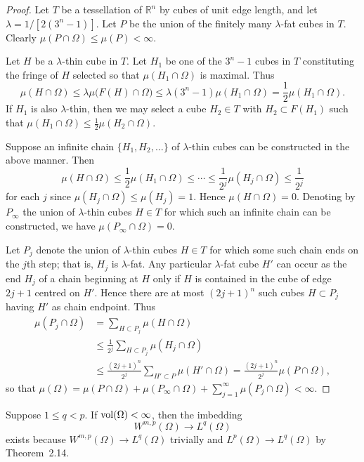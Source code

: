 \begin{proof}
  Let $T$ be a tessellation of $\mathbb{R}^n$ by cubes of unit edge length,
  and let $\lambda=1/[2(3^n-1)]$. Let $P$ be the union of the finitely many
  $\lambda$-fat cubes in $T$. Clearly $\mu(P\cap\Omega)\leq\mu(P)<\infty$.

  Let $H$ be a $\lambda$-thin cube in $T$. Let $H_1$ be one of the $3^n-1$
  cubes in $T$ constituting the fringe of $H$ selected so that $\mu(H_1\cap\Omega)$
  is maximal. Thus
  \[ \mu(H\cap\Omega) \leq \lambda \mu\bigl(F(H)\cap\Omega\bigr) 
      \leq \lambda (3^n-1) \mu(H_1\cap\Omega) = \frac12 \mu(H_1\cap\Omega). \]
  If $H_1$ is also $\lambda$-thin, then we may select a cube $H_2\in T$ with
  $H_2\subset F(H_1)$ such that $\mu(H_1\cap\Omega) \leq \frac12 \mu(H_2\cap\Omega)$.

  Suppose an infinite chain $\{H_1,H_2,\ldots\}$ of $\lambda$-thin cubes can be
  constructed in the above manner. Then
  \[ \mu(H\cap\Omega) \leq \frac12 \mu(H_1\cap\Omega) \leq \cdots
      \leq \frac{1}{2^j} \mu(H_j\cap\Omega) \leq \frac{1}{2^j} \]
  for each $j$ since $\mu(H_j\cap\Omega)\leq\mu(H_j)=1$.
  Hence $\mu(H\cap\Omega)=0$. Denoting by $P_\infty$ the union of $\lambda$-thin
  cubes $H\in T$ for which such an infinite chain can be constructed,
  we have $\mu(P_\infty\cap\Omega)=0$.

  Let $P_j$ denote the union of $\lambda$-thin cubes $H\in T$ for which
  some such chain ends on the $j$th step; that is, $H_j$ is $\lambda$-fat.
  Any particular $\lambda$-fat cube $H'$ can occur as the end $H_j$ of a chain
  beginning at $H$ only if $H$ is contained in the cube of edge $2j+1$
  centred on $H'$. Hence there are at most $(2j+1)^n$ such cubes $H\subset P_j$
  having $H'$ as chain endpoint. Thus
  \begin{align*}
    \mu(P_j\cap\Omega)
    & = \sum_{H\subset P_j} \mu(H\cap\Omega) \\
    & \leq \frac{1}{2^j} \sum_{H\subset P_j} \mu(H_j\cap\Omega) \\
    & \leq \frac{(2j+1)^n}{2^j} \sum_{H'\subset P} \mu(H'\cap\Omega)
      = \frac{(2j+1)^n}{2^j} \mu(P\cap\Omega),
  \end{align*}
  so that $\mu(\Omega) = \mu(P\cap\Omega) + \mu(P_\infty\cap\Omega) +
  \sum_{j=1}^\infty \mu(P_j\cap\Omega)<\infty$.
\end{proof}

Suppose $1\leq q<p$. If $\operatorname{vol}(\Omega)<\infty$, then the imbedding
\[ W^{m,p}(\Omega) \to L^q(\Omega) \]
exists because $W^{m,p}(\Omega) \to L^q(\Omega)$ trivially and $L^p(\Omega)\to L^q(\Omega)$
by Theorem~2.14.

